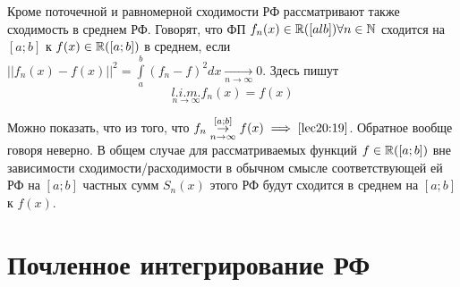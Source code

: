 \documentclass[../../main.tex]{subfiles}
\begin{document}
	\begin{rem}
		Кроме поточечной и равномерной сходимости РФ
		рассматривают также сходимость в среднем РФ.
		Говорят, что ФП $ f_n(x) \in \mathbb{R}([al b]) \forall
		n \in \mathbb{N} $ сходится на $ [a; b] $ к $ f(x) \in 
		\mathbb{R}([a; b]) $ в среднем, если $ ||f_n(x) - f(x)||^2=
		\int\limits_{a}^b (f_n - f)^2 dx \underset{n \to \infty}{\to} 0 $.
		Здесь пишут 
		\begin{equation}
		\label{lec20:19}
			\underset{n \to \infty}{l.i.m.} f_n(x) = f(x) 
		\end{equation}
	\end{rem}
	Можно показать, что из того, что $ f_n 
	\stackrel{[a; b]}{\underset{n \to \infty}{\to}} f(x) 
	\implies \eqref{lec20:19} $. Обратное вообще говоря неверно.
	В общем случае для рассматриваемых функций $ f \in \mathbb{R}([a;b]) $
	вне зависимости сходимости/расходимости в обычном смысле соответствующей ей
	РФ на $ [a; b] $ частных сумм $ S_n(x) $ этого РФ
	будут сходится в среднем на $ [a; b] $ к $ f(x) $.
	
	\section{Почленное интегрирование РФ}
	
\end{document}
